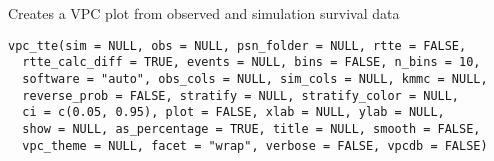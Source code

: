 \documentclass[letterpaper]{book}
\begin{document}
%
\begin{Description}\relax
Creates a VPC plot from observed and simulation survival data
\end{Description}
%
\begin{Usage}
\begin{verbatim}
vpc_tte(sim = NULL, obs = NULL, psn_folder = NULL, rtte = FALSE,
  rtte_calc_diff = TRUE, events = NULL, bins = FALSE, n_bins = 10,
  software = "auto", obs_cols = NULL, sim_cols = NULL, kmmc = NULL,
  reverse_prob = FALSE, stratify = NULL, stratify_color = NULL,
  ci = c(0.05, 0.95), plot = FALSE, xlab = NULL, ylab = NULL,
  show = NULL, as_percentage = TRUE, title = NULL, smooth = FALSE,
  vpc_theme = NULL, facet = "wrap", verbose = FALSE, vpcdb = FALSE)
\end{verbatim}
\end{Usage}
%
\end{document}
